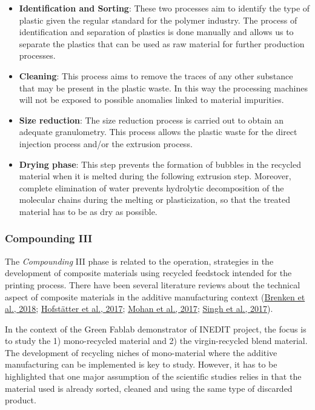 \documentclass[
  11pt,
]{article}
\begin{document}
\begin{itemize}
\item
  \textbf{Identification and Sorting}: These two processes aim to
  identify the type of plastic given the regular standard for the
  polymer industry. The process of identification and separation of
  plastics is done manually and allows us to separate the plastics that
  can be used as raw material for further production processes.
\item
  \textbf{Cleaning}: This process aims to remove the traces of any other
  substance that may be present in the plastic waste. In this way the
  processing machines will not be exposed to possible anomalies linked
  to material impurities.
\item
  \textbf{Size reduction}: The size reduction process is carried out to
  obtain an adequate granulometry. This process allows the plastic waste
  for the direct injection process and/or the extrusion process.
\item
  \textbf{Drying phase}: This step prevents the formation of bubbles in
  the recycled material when it is melted during the following extrusion
  step. Moreover, complete elimination of water prevents hydrolytic
  decomposition of the molecular chains during the melting or
  plasticization, so that the treated material has to be as dry as
  possible.
\end{itemize}

\hypertarget{compounding-iii}{%
\subsubsection{Compounding III}\label{compounding-iii}}

The \emph{Compounding} III phase is related to the operation, strategies
in the development of composite materials using recycled feedstock
intended for the printing process. There have been several literature
reviews about the technical aspect of composite materials in the
additive manufacturing context
(\protect\hyperlink{ref-Brenken2017}{Brenken et al., 2018};
\protect\hyperlink{ref-Hofstatter2017}{Hofstätter et al., 2017};
\protect\hyperlink{ref-Mohan2017}{Mohan et al., 2017};
\protect\hyperlink{ref-Singh2017}{Singh et al., 2017}).

In the context of the Green Fablab demonstrator of INEDIT project, the
focus is to study the 1) mono-recycled material and 2) the
virgin-recycled blend material. The development of recycling niches of
mono-material where the additive manufacturing can be implemented is key
to study. However, it has to be highlighted that one major assumption of
the scientific studies relies in that the material used is already
sorted, cleaned and using the same type of discarded product.
\end{document}

